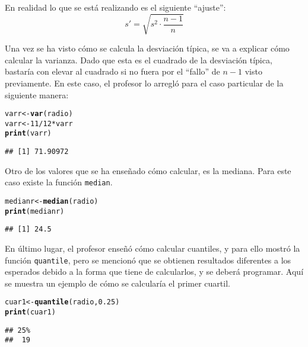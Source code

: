 \documentclass[12pt]{report}\usepackage[]{graphicx}\usepackage[dvipsnames]{xcolor}
\makeatletter
\newcommand{\hlnum}[1]{\textcolor[rgb]{0.686,0.059,0.569}{#1}}%
\newcommand{\hlopt}[1]{\textcolor[rgb]{0,0,0}{#1}}%
\newcommand{\hlstd}[1]{\textcolor[rgb]{0.345,0.345,0.345}{#1}}%
\newcommand{\hlkwb}[1]{\textcolor[rgb]{0.69,0.353,0.396}{#1}}%
\newcommand{\hlkwd}[1]{\textcolor[rgb]{0.737,0.353,0.396}{\textbf{#1}}}%
\newenvironment{kframe}{%
 \def\at@end@of@kframe{}%
 \ifinner\ifhmode%
  \def\at@end@of@kframe{\end{minipage}}%
  \begin{minipage}{\columnwidth}%
 \fi\fi%
 \def\FrameCommand##1{\hskip\@totalleftmargin \hskip-\fboxsep
 \colorbox{shadecolor}{##1}\hskip-\fboxsep
     \hskip-\linewidth \hskip-\@totalleftmargin \hskip\columnwidth}%
 \MakeFramed {\advance\hsize-\width
   \@totalleftmargin\z@ \linewidth\hsize
   \@setminipage}}%
 {\par\unskip\endMakeFramed%
 \at@end@of@kframe}
\newenvironment{knitrout}{}{} %
\makeatother
\begin{document}
			En realidad lo que se está realizando es el siguiente ``ajuste'': 
			$$
			s' = \sqrt{s^2\cdot\frac{n-1}{n}}
			$$
			
			Una vez se ha visto cómo se calcula la desviación típica, se va a explicar cómo calcular la varianza. Dado que esta es el cuadrado de la desviación típica, bastaría con elevar al cuadrado si no fuera por el ``fallo'' de $n-1$ visto previamente. En este caso, el profesor lo arregló para el caso particular de la siguiente manera:
			
\begin{knitrout}
\color{fgcolor}\begin{kframe}
\begin{alltt}
\hlstd{varr} \hlkwb{<-} \hlkwd{var}\hlstd{(radio)}
\hlstd{varr} \hlkwb{<-} \hlnum{11}\hlopt{/}\hlnum{12} \hlopt{*} \hlstd{varr}
\hlkwd{print}\hlstd{(varr)}
\end{alltt}
\begin{verbatim}
## [1] 71.90972
\end{verbatim}
\end{kframe}
\end{knitrout}
			
			Otro de los valores que se ha enseñado cómo calcular, es la mediana. Para este caso existe la función \texttt{median}. 
			
\begin{knitrout}
\color{fgcolor}\begin{kframe}
\begin{alltt}
\hlstd{medianr} \hlkwb{<-} \hlkwd{median}\hlstd{(radio)}
\hlkwd{print}\hlstd{(medianr)}
\end{alltt}
\begin{verbatim}
## [1] 24.5
\end{verbatim}
\end{kframe}
\end{knitrout}
			
			En último lugar, el profesor enseñó cómo calcular cuantiles, y para ello mostró la función \texttt{quantile}, pero se mencionó que se obtienen resultados diferentes a los esperados debido a la forma que tiene de calcularlos, y se deberá programar. Aquí se muestra un ejemplo de cómo se calcularía el primer cuartil. 
			
\begin{knitrout}
\color{fgcolor}\begin{kframe}
\begin{alltt}
\hlstd{cuar1} \hlkwb{<-} \hlkwd{quantile}\hlstd{(radio,} \hlnum{0.25}\hlstd{)}
\hlkwd{print}\hlstd{(cuar1)}
\end{alltt}
\begin{verbatim}
## 25% 
##  19
\end{verbatim}
\end{kframe}
\end{knitrout}
\end{document}
